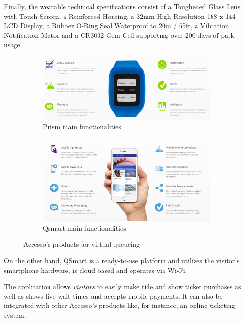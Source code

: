 Finally, the wearable technical specifications consist of a Toughened Glass Lens with Touch Screen, a Reinforced Housing, a 32mm High Resolution 168 x 144 LCD Display, a Rubber O‑Ring Seal Waterproof to 20m / 65ft,
a Vibration Notification Motor and a CR3032 Coin Cell supporting over 200 days of park usage.

\begin{figure}[H]
    \centering
    \begin{subfigure}[b]{0.85\textwidth}
        \centering
        \includegraphics[width=\textwidth]{img/prism}
        \caption{Prism main functionalities}
        \label{fig:prism}
    \end{subfigure}
    \hfill
    \begin{subfigure}[b]{0.85\textwidth}
        \centering
        \includegraphics[width=\textwidth]{img/qsmart}
        \caption{Qsmart main functionalities}
        \label{fig:qsmart}
    \end{subfigure}
    \caption{Accesso's products for virtual queueing\footnotemark}
    \label{fig:prismart}
\end{figure}

On the other hand, QSmart is a ready-to-use platform and utilizes the visitor's smartphone hardware, is cloud based
and operates via Wi-Fi.

The application allows \textit{visitors} to easily make ride and show ticket purchases as well as shows
live wait times and accepts mobile payments.
It can also be integrated with other Accesso's products like, for instance, an online ticketing system.



